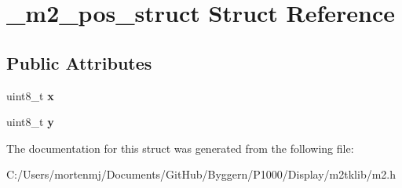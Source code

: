 \hypertarget{struct__m2__pos__struct}{\section{\-\_\-m2\-\_\-pos\-\_\-struct Struct Reference}
\label{struct__m2__pos__struct}
}
\subsection*{Public Attributes}
\begin{DoxyCompactItemize}
\item 
\hypertarget{struct__m2__pos__struct_a5454d7c0cbe524e332dd4293323d09a1}{uint8\-\_\-t {\bfseries x}}\label{struct__m2__pos__struct_a5454d7c0cbe524e332dd4293323d09a1}

\item 
\hypertarget{struct__m2__pos__struct_acf90c103745b7e52eb4b2d7f232ea19b}{uint8\-\_\-t {\bfseries y}}\label{struct__m2__pos__struct_acf90c103745b7e52eb4b2d7f232ea19b}

\end{DoxyCompactItemize}


The documentation for this struct was generated from the following file\-:\begin{DoxyCompactItemize}
\item 
C\-:/\-Users/mortenmj/\-Documents/\-Git\-Hub/\-Byggern/\-P1000/\-Display/m2tklib/m2.\-h\end{DoxyCompactItemize}
